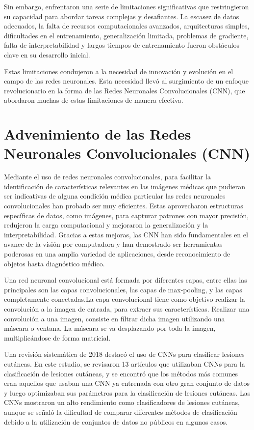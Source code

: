 Sin embargo, enfrentaron una serie de limitaciones significativas que restringieron su capacidad para abordar tareas complejas y desafiantes. La escasez de datos adecuados, la falta de recursos computacionales avanzados, arquitecturas simples, dificultades en el entrenamiento, generalización limitada, problemas de gradiente, falta de interpretabilidad y largos tiempos de entrenamiento fueron obstáculos clave en su desarrollo inicial.

Estas limitaciones condujeron a la necesidad de innovación y evolución en el campo de las redes neuronales. Esta necesidad llevó al surgimiento de un enfoque revolucionario en la forma de las Redes Neuronales Convolucionales (CNN), que abordaron muchas de estas limitaciones de manera efectiva.

\section*{Advenimiento de las Redes Neuronales Convolucionales (CNN)}   

Mediante el uso de redes neuronales convolucionales, para facilitar la identificación de características relevantes en las imágenes médicas que pudieran ser indicativas de alguna condición médica particular las redes neuronales convolucionales han probado ser muy eficientes. Estas aprovecharon estructuras específicas de datos, como imágenes, para capturar patrones con mayor precisión, redujeron la carga computacional y mejoraron la generalización y la interpretabilidad. Gracias a estas mejoras, las CNN han sido fundamentales en el avance de la visión por computadora y han demostrado ser herramientas poderosas en una amplia variedad de aplicaciones, desde reconocimiento de objetos hasta diagnóstico médico. 

Una red neuronal convolucional está formada por diferentes capas, entre ellas las principales son las capas convolucionales, las capas de max-pooling, y las capas completamente conectadas.La capa convolucional tiene como objetivo realizar la convolución a la imagen de entrada, para extraer sus características. Realizar una convolución a una imagen, consiste en filtrar dicha imagen utilizando una máscara o ventana. La máscara se va desplazando por toda la imagen, multiplicándose de forma matricial. %

Una revisión sistemática de 2018 destacó el uso de CNNs para clasificar lesiones cutáneas. En este estudio, se revisaron 13 artículos que utilizaban CNNs para la clasificación de lesiones cutáneas, y se encontró que los métodos más comunes eran aquellos que usaban una CNN ya entrenada con otro gran conjunto de datos y luego optimizaban sus parámetros para la clasificación de lesiones cutáneas. Las CNNs mostraron un alto rendimiento como clasificadores de lesiones cutáneas, aunque se señaló la dificultad de comparar diferentes métodos de clasificación debido a la utilización de conjuntos de datos no públicos en algunos casos. %

